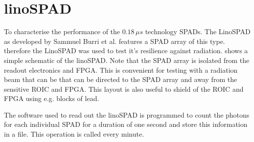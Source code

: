 \section{linoSPAD}\label{ssec:linoSPAD}
To characterise the performance of the $0.18\,\mu s$ technology SPADs. The LinoSPAD as developed by Sammuel Burri et al. features a SPAD array of this type. therefore the LinoSPAD was used to test it's resilience against radiation.  shows a simple schematic of the linoSPAD. Note that the SPAD array is isolated from the readout electronics and FPGA. This is convenient for testing with a radiation beam that can be that can be directed to the SPAD array and away from the sensitive ROIC and FPGA. This layout is also useful to shield of the ROIC and FPGA using e.g. blocks of lead.



The software used to read out the linoSPAD is programmed to count the photons for each individual SPAD for a duration of one second and store this information in a file. This operation is called every minute.

